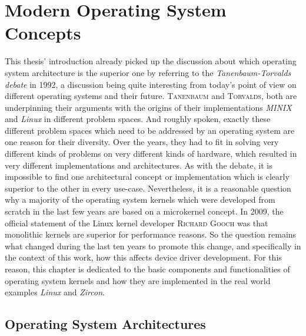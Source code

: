 
\chapter{Modern Operating System Concepts}\label{ch:modern-os-concepts}
This thesis' introduction already picked up the discussion about which operating system architecture is the superior one by referring to the \textit{Tanenbaum-Torvalds debate}\cite{linux-is-obsolete} in 1992, a discussion being quite interesting from today's point of view on different operating systems and their future.
\textsc{Tanenbaum} and \textsc{Torvalds}, both are underpinning their arguments with the origins of their implementations \textit{MINIX} and \textit{Linux} in different problem spaces. 
And roughly spoken, exactly these different problem spaces which need to be addressed by an operating system are one reason for their diversity. 
Over the years, they had to fit in solving very different kinds of problems on very different kinds of hardware, which resulted in very different implementations and architectures. 
As with the debate, it is impossible to find one architectural concept or implementation which is clearly superior to the other in every use-case. 
Nevertheless, it is a reasonable question why a majority of the operating system kernels which were developed from scratch in the last few years are based on a microkernel concept.
In 2009, the official statement of the Linux kernel developer \textsc{Richard Gooch} was that monolithic kernels are superior for performance reasons\cite{why-linux-monolith}.
So the question remains what changed during the last ten years to promote this change, and specifically in the context of this work, how this affects device driver development.
For this reason, this chapter is dedicated to the basic components and functionalities of operating system kernels and how they are implemented in the real world examples \textit{Linux} and \textit{Zircon}.

\section{Operating System Architectures}\label{sec:kernel-arch-concepts}


